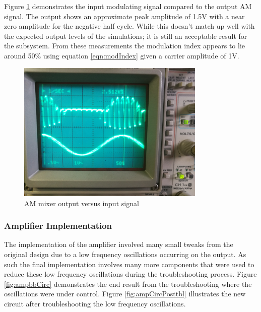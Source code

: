 Figure \ref{fig:mixerinVsout} demonstrates the input modulating signal compared to the output AM signal. The output shows an approximate peak amplitude of 1.5V with a near zero amplitude for the negative half cycle. While this doesn't match up well with the expected output levels of the simulations; it is still an acceptable result for the subsystem. From these measurements the modulation index appears to lie around 50\% using equation \ref{eqn:modIndex} given a carrier amplitude of 1V.

\begin{figure}[ht!]
    \centering
    \includegraphics[width=0.8\textwidth]{Figures/Implementation/Mixer/mixoutVsin.jpg}
    \caption{AM mixer output versus input signal}
    \label{fig:mixerinVsout}
\end{figure}

\subsubsection{Amplifier Implementation}
The implementation of the amplifier involved many small tweaks from the original design due to a low frequency oscillations occurring on the output. As such the final implementation involves many more components that were used to reduce these low frequency oscillations during the troubleshooting process. Figure \ref{fig:ampbbCirc} demonstrates the end result from the troubleshooting where the oscillations were under control. Figure \ref{fig:ampCircPosttbl} illustrates the new circuit after troubleshooting the low frequency oscillations.

